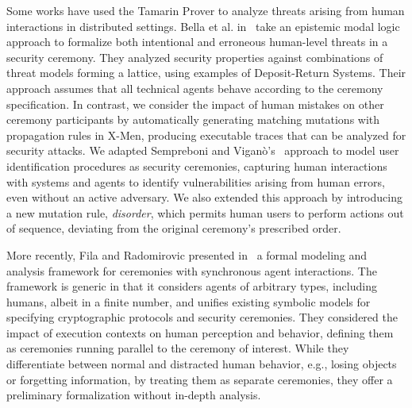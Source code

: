 Some works have used the Tamarin Prover to analyze threats arising from human interactions in distributed settings. Bella et al. in~\cite{bella2022modelling} take an epistemic modal logic approach to formalize both intentional and erroneous human-level threats in a security ceremony. They analyzed security properties against combinations of threat models forming a lattice, using examples of Deposit-Return Systems. Their approach assumes that all technical agents behave according to the ceremony specification. In contrast, we consider the impact of human mistakes on other ceremony participants by automatically generating matching mutations with propagation rules in X-Men, producing executable traces that can be analyzed for security attacks. We adapted Sempreboni and Viganò's~\cite{sempreboni2023mutation} approach to model user identification procedures as security ceremonies, capturing human interactions with systems and agents to identify vulnerabilities arising from human errors, even without an active adversary. We also extended this approach by introducing a new mutation rule, \emph{disorder}, which permits human users to perform actions out of sequence, deviating from the original ceremony's prescribed order.

More recently, Fila and Radomirovic presented in~\cite{fila2024nothing} a formal modeling and analysis framework for ceremonies with synchronous agent interactions. The framework is generic in that it considers agents of arbitrary types, including humans, albeit in a finite number, and unifies existing symbolic models for specifying cryptographic protocols and security ceremonies. They considered the impact of execution contexts on human perception and behavior, defining them as ceremonies running parallel to the ceremony of interest. While they differentiate between normal and distracted human behavior, e.g., losing objects or forgetting information, by treating them as separate ceremonies, they offer a preliminary formalization without in-depth analysis.